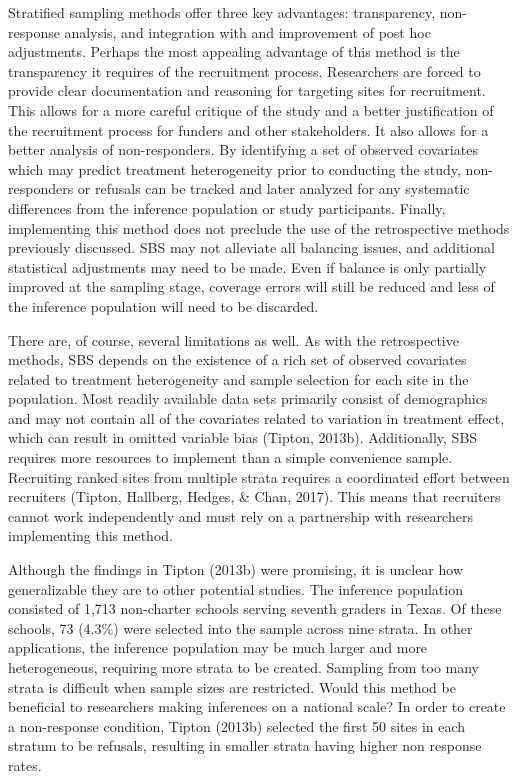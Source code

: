 \documentclass[man,floatsintext]{apa6}
\begin{document}
Stratified sampling methods offer three key advantages: transparency, non-response analysis, and integration with and improvement of post hoc adjustments. Perhaps the most appealing advantage of this method is the transparency it requires of the recruitment process. Researchers are forced to provide clear documentation and reasoning for targeting sites for recruitment. This allows for a more careful critique of the study and a better justification of the recruitment process for funders and other stakeholders. It also allows for a better analysis of non-responders. By identifying a set of observed covariates which may predict treatment heterogeneity prior to conducting the study, non-responders or refusals can be tracked and later analyzed for any systematic differences from the inference population or study participants. Finally, implementing this method does not preclude the use of the retrospective methods previously discussed. SBS may not alleviate all balancing issues, and additional statistical adjustments may need to be made. Even if balance is only partially improved at the sampling stage, coverage errors will still be reduced and less of the inference population will need to be discarded.

There are, of course, several limitations as well. As with the retrospective methods, SBS depends on the existence of a rich set of observed covariates related to treatment heterogeneity and sample selection for each site in the population. Most readily available data sets primarily consist of demographics and may not contain all of the covariates related to variation in treatment effect, which can result in omitted variable bias (Tipton, 2013b). Additionally, SBS requires more resources to implement than a simple convenience sample. Recruiting ranked sites from multiple strata requires a coordinated effort between recruiters (Tipton, Hallberg, Hedges, \& Chan, 2017). This means that recruiters cannot work independently and must rely on a partnership with researchers implementing this method.

Although the findings in Tipton (2013b) were promising, it is unclear how generalizable they are to other potential studies. The inference population consisted of 1,713 non-charter schools serving seventh graders in Texas. Of these schools, 73 (4.3\%) were selected into the sample across nine strata. In other applications, the inference population may be much larger and more heterogeneous, requiring more strata to be created. Sampling from too many strata is difficult when sample sizes are restricted. Would this method be beneficial to researchers making inferences on a national scale? In order to create a non-response condition, Tipton (2013b) selected the first 50 sites in each stratum to be refusals, resulting in smaller strata having higher non response rates.
\end{document}
